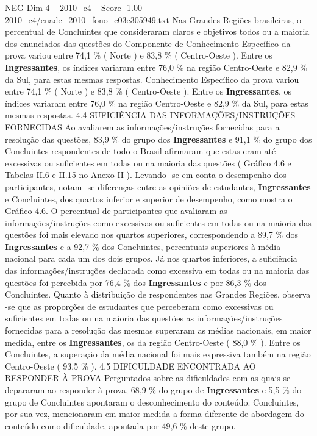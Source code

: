 \begin{textsample}{NEG Dim 4 – 2010\_c4 – Score -1.00 – 2010\_c4/enade\_2010\_fono\_c03e305949.txt}
Nas Grandes Regiões brasileiras, o percentual de Concluintes que consideraram claros e objetivos todos ou a maioria dos enunciados das questões do Componente de Conhecimento Específico da prova variou entre 74,1 \% ( Norte ) e 83,8 \% ( Centro-Oeste ).
Entre os \textbf{Ingressantes}, os índices variaram entre 76,0 \% na região Centro-Oeste e 82,9 \% da Sul, para estas mesmas respostas.
Conhecimento Específico da prova variou entre 74,1 \% ( Norte ) e 83,8 \% ( Centro-Oeste ).
Entre os \textbf{Ingressantes}, os índices variaram entre 76,0 \% na região Centro-Oeste e 82,9 \% da Sul, para estas mesmas respostas. 4.4 SUFICIÊNCIA DAS INFORMAÇÕES/INSTRUÇÕES FORNECIDAS Ao avaliarem as informações/instruções fornecidas para a resolução das questões, 83,9 \% do grupo dos \textbf{Ingressantes} e 91,1 \% do grupo dos Concluintes respondentes de todo o Brasil afirmaram que estas eram até excessivas ou suficientes em todas ou na maioria das questões ( Gráfico 4.6 e Tabelas II.6 e II.15 no Anexo II ).
Levando -se em conta o desempenho dos participantes, notam -se diferenças entre as opiniões de estudantes, \textbf{Ingressantes} e Concluintes, dos quartos inferior e superior de desempenho, como mostra o Gráfico 4.6.
O percentual de participantes que avaliaram as informações/instruções como excessivas ou suficientes em todas ou na maioria das questões foi mais elevado nos quartos superiores, correspondendo a 89,7 \% dos \textbf{Ingressantes} e a 92,7 \% dos Concluintes, percentuais superiores à média nacional para cada um dos dois grupos.
Já nos quartos inferiores, a suficiência das informações/instruções declarada como excessiva em todas ou na maioria das questões foi percebida por 76,4 \% dos \textbf{Ingressantes} e por 86,3 \% dos Concluintes.
Quanto à distribuição de respondentes nas Grandes Regiões, observa -se que as proporções de estudantes que perceberam como excessivas ou suficientes em todas ou na maioria das questões as informações/instruções fornecidas para a resolução das mesmas superaram as médias nacionais, em maior medida, entre os \textbf{Ingressantes}, os da região Centro-Oeste ( 88,0 \% ).
Entre os Concluintes, a superação da média nacional foi mais expressiva também na região Centro-Oeste ( 93,5 \% ). 4.5 DIFICULDADE ENCONTRADA AO RESPONDER À PROVA Perguntados sobre as dificuldades com as quais se depararam ao responder à prova, 68,9 \% do grupo de \textbf{Ingressantes} e 5,5 \% do grupo de Concluintes apontaram o desconhecimento do conteúdo.
Concluintes, por sua vez, mencionaram em maior medida a forma diferente de abordagem do conteúdo como dificuldade, apontada por 49,6 \% deste grupo.

\end{textsample}
